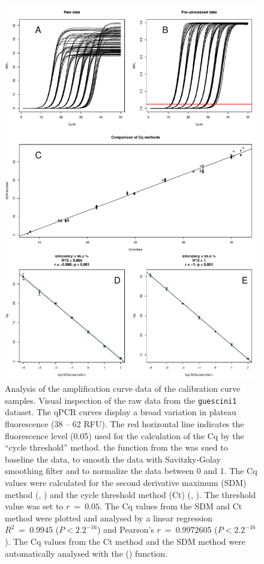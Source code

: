\begin{figure}[htbp]
  \centering
  \includegraphics[clip=true, width=14cm]{figures/dilution_Cq.pdf}
  \caption{Analysis of the amplification curve data of the calibration curve 
samples.  Visual inspection of the raw data from the \texttt{guescini1} 
dataset. The qPCR curves display a broad variation in plateau fluorescence (38 
-- 62 RFU). The red horizontal line indicates the fluorescence level (0.05) used 
for the calculation of the Cq by the ``cycle threshold'' method.  
the  function from the  was sued to baseline the 
data, to smooth the data with Savitzky-Golay smoothing filter and to normalize 
the data between 0 and 1.  The Cq values were calculated for the 
second derivative maximum (SDM) method (, ) and the 
cycle threshold method (Ct) (, ). The threshold 
value was set to $r~=~0.05$. The Cq values from the SDM and Ct method were 
plotted and analysed by a linear regression $R^{2}~=~0.9945$ ($P < 2.2^{-16}$) 
and Pearson's $r~=~0.9972605$ ($P < 2.2^{-16}$). The Cq values from  
the Ct method and  the SDM method were automatically analysed with 
the  () function.}
  \label{figure:dilution_Cq}
\end{figure}

